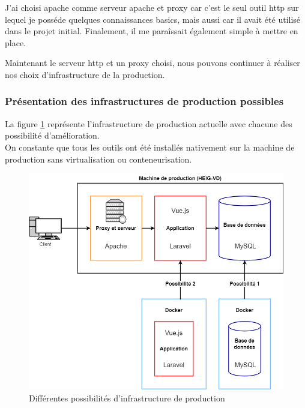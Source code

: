 \documentclass[
    iai, %
    il, %
]{heig-tb}
\begin{document}
J'ai choisi \Gls{apache} comme serveur \Gls{apache} et \Gls{proxy} car c'est le seul outil \Gls{http} sur lequel je posséde quelques connaissances basics, mais aussi car il avait été utilisé dans le projet initial. Finalement, il me paraîssait également simple à mettre en place.

Maintenant le serveur \Gls{http} et un \Gls{proxy} choisi, nous pouvons continuer à réaliser nos choix d'infrastructure de la production.

\subsubsection{Présentation des infrastructures de production possibles}

La figure \ref{infrastructure-prod-choix.drawio} représente l'infrastructure de production actuelle avec chacune des possibilité d'amélioration. \\
On constante que tous les outils ont été installés nativement sur la machine de production sans virtualisation ou conteneurisation.

\begin{center}
    \begin{figure}
        \includegraphics[width=\textwidth]{./assets/figures/infrastructure-prod-choix.drawio.png}
        \caption{Différentes possibilités d'infrastructure de production \label{infrastructure-prod-choix.drawio}}
    \end{figure}
\end{center}
\end{document}
